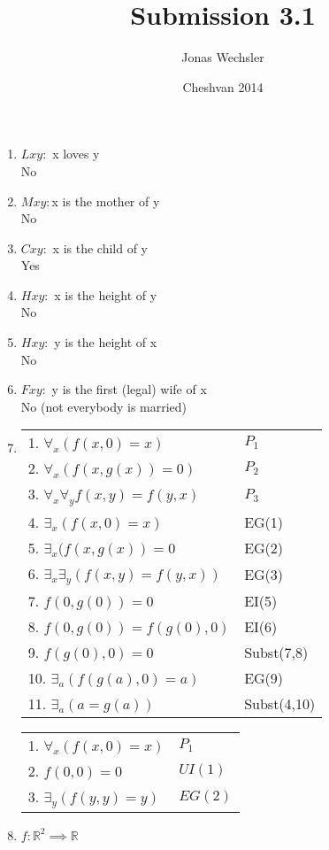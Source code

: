 \documentclass{article}
\title{Submission 3.1}
\author{Jonas Wechsler}
\date{Cheshvan 2014}
\begin{document}
	\maketitle
	\begin{enumerate}
		\item
			$Lxy:$ x loves y\\
			No
		\item
			$Mxy:$x is the mother of y\\
			No
		\item
			$Cxy:$ x is the child of y\\
			Yes
		\item
			$Hxy:$ x is the height of y\\
			No
		\item
			$Hxy:$ y is the height of x\\
			No
		\item
			$Fxy:$ y is the first (legal) wife of x\\
			No (not everybody is married)
		\item
			\begin{tabular}{l l}
				1. $\forall _x (f(x,0)=x)$ & $P_1$\\
				2. $\forall _x (f(x,g(x)) = 0)$ & $P_2$\\
				3. $\forall _x \forall _y f(x,y) = f(y,x)$ & $P_3$\\
				4. $\exists _x (f(x,0) = x)$ & EG(1)\\
				5. $\exists _x (f(x,g(x)) = 0$ & EG(2)\\
				6. $\exists _x \exists _y(f(x,y)=f(y,x))$ & EG(3)\\
				7. $f(0,g(0)) = 0$ & EI(5)\\
				8. $f(0,g(0)) = f(g(0),0)$ & EI(6)\\
				9. $f(g(0),0) = 0$ & Subst(7,8)\\
				10. $\exists _a (f(g(a),0) = a)$ & EG(9)\\
				11. $\exists _a (a = g(a))$ & Subst(4,10)\\
			\end{tabular}
			\begin{tabular}{l l}
				1. $\forall _x (f(x,0)=x)$ & $P_1$\\
				2. $f(0,0) = 0$ & $UI(1)$\\
				3. $\exists _y(f(y,y)=y)$ & $EG(2)$\\
			\end{tabular}
		\item
			$f:\mathbb{R}^2 \implies \mathbb{R}$\\

\end{enumerate}
\end{document}
